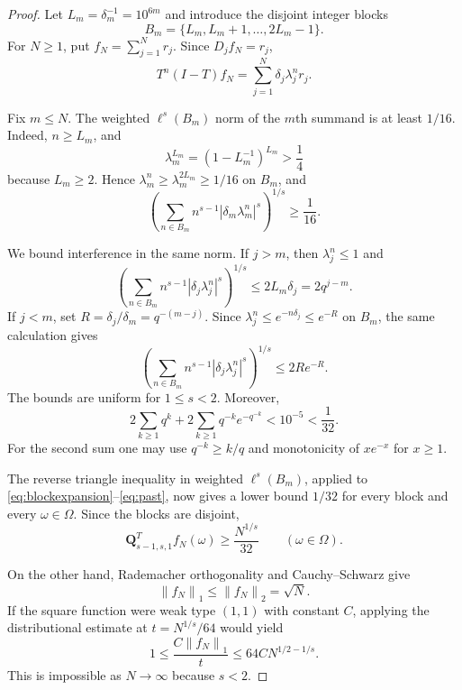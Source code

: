\documentclass[11pt]{article}
\theoremstyle{remark}
\newcommand{\norm}[1]{\left\lVert#1\right\rVert}
\begin{document}
\begin{proof}
Let $L_m=\delta_m^{-1}=10^{6m}$ and introduce the disjoint integer blocks
\[
 B_m=\{L_m,L_m+1,\ldots,2L_m-1\}.
\]
For $N\geq1$, put $f_N=\sum_{j=1}^Nr_j$.  Since $D_jf_N=r_j$,
\begin{equation}\label{eq:blockexpansion}
 T^n(I-T)f_N=\sum_{j=1}^N\delta_j\lambda_j^n r_j.
\end{equation}

Fix $m\leq N$.  The weighted $\ell^s(B_m)$ norm of the $m$th summand is at
least $1/16$.  Indeed, $n\geq L_m$, and
\[
 \lambda_m^{L_m}=(1-L_m^{-1})^{L_m}>\frac14
\]
because $L_m\geq2$.  Hence $\lambda_m^n\geq\lambda_m^{2L_m}\geq1/16$ on
$B_m$, and
\begin{equation}\label{eq:target}
 \left(\sum_{n\in B_m}n^{s-1}
       |\delta_m\lambda_m^n|^s\right)^{1/s}\geq\frac1{16}.
\end{equation}

We bound interference in the same norm.  If $j>m$, then $\lambda_j^n\leq1$
and
\begin{equation}\label{eq:future}
 \left(\sum_{n\in B_m}n^{s-1}
       |\delta_j\lambda_j^n|^s\right)^{1/s}
 \leq2L_m\delta_j=2q^{j-m}.
\end{equation}
If $j<m$, set $R=\delta_j/\delta_m=q^{-(m-j)}$.  Since
$\lambda_j^n\leq e^{-n\delta_j}\leq e^{-R}$ on $B_m$, the same calculation
gives
\begin{equation}\label{eq:past}
 \left(\sum_{n\in B_m}n^{s-1}
       |\delta_j\lambda_j^n|^s\right)^{1/s}
 \leq2Re^{-R}.
\end{equation}
The bounds are uniform for $1\leq s<2$.  Moreover,
\[
 2\sum_{k\geq1}q^k+2\sum_{k\geq1}q^{-k}e^{-q^{-k}}<10^{-5}<\frac1{32}.
\]
For the second sum one may use $q^{-k}\geq k/q$ and monotonicity of
$xe^{-x}$ for $x\geq1$.

The reverse triangle inequality in weighted $\ell^s(B_m)$, applied to
\eqref{eq:blockexpansion}--\eqref{eq:past}, now gives a lower bound $1/32$
for every block and every $\omega\in\Omega$.  Since the blocks are disjoint,
\begin{equation}\label{eq:pointwise}
 \mathbf Q^T_{s-1,s,1}f_N(\omega)\geq\frac{N^{1/s}}{32}
 \qquad(\omega\in\Omega).
\end{equation}

On the other hand, Rademacher orthogonality and Cauchy--Schwarz give
\begin{equation}\label{eq:l1}
 \norm{f_N}_1\leq\norm{f_N}_2=\sqrt N.
\end{equation}
If the square function were weak type $(1,1)$ with constant $C$, applying the
distributional estimate at $t=N^{1/s}/64$ would yield
\[
 1\leq \frac{C\norm{f_N}_1}{t}
 \leq64C N^{1/2-1/s}.
\]
This is impossible as $N\to\infty$ because $s<2$.
\end{proof}
\end{document}
